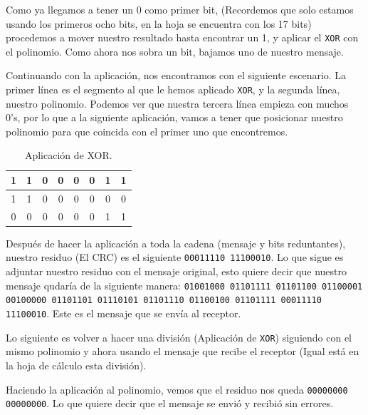 \documentclass[spanish,12pt,letterpaper]{article}
\begin{document}
Como ya llegamos a tener un 0 como primer bit, (Recordemos que solo estamos
usando los primeros ocho bits, en la hoja se encuentra con los 17 bits)
procedemos a mover nuestro resultado hasta encontrar un 1, y aplicar el
\texttt{XOR} con el polinomio. Como ahora nos sobra un bit, bajamos uno de
nuestro mensaje.

Continuando con la aplicación, nos encontramos con el siguiente escenario. La
primer línea es el segmento al que le hemos aplicado \texttt{XOR}, y la segunda
línea, nuestro polinomio. Podemos ver que nuestra tercera línea empieza con
muchos 0's, por lo que a la siguiente aplicación, vamos a tener que posicionar
nuestro polinomio para que coincida con el primer uno que encontremos.

\begin{table}[H]
  \centering
  \begin{tabular}{| c | c | c | c | c | c | c | c |}\hline
    1 & 1 & 0 & 0 & 0 & 0 & 1 & 1 \\ \hline
    1 & 1 & 0 & 0 & 0 & 0 & 0 & 0 \\ \hline
    0 & 0 & 0 & 0 & 0 & 0 & 1 & 1 \\ \hline
  \end{tabular}
  \caption{Aplicación de XOR.}
\end{table}

Después de hacer la aplicación a toda la cadena (mensaje y bits reduntantes),
nuestro residuo (El CRC) es el siguiente \texttt{00011110 11100010}. Lo que sigue
es adjuntar nuestro residuo con el mensaje original, esto quiere decir que
nuestro mensaje qudaría de la siguiente manera: \texttt{01001000 01101111
  01101100 01100001 00100000 01101101 01110101 01101110 01100100 01101111
  00011110 11100010}. Este es el mensaje que se envía al receptor.

Lo siguiente es volver a hacer una división (Aplicación de \texttt{XOR})
siguiendo con el mismo polinomio y ahora usando el mensaje que recibe el
receptor (Igual está en la hoja de cálculo esta división).

Haciendo la aplicación al polinomio, vemos que el residuo nos queda
\texttt{00000000 00000000}. Lo que quiere decir que el mensaje se envió y recibió
sin errores.
\end{document}
